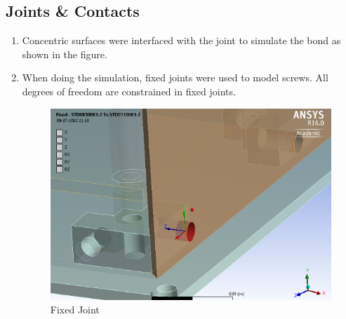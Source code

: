 \documentclass[../../main.tex]{subfiles}
\begin{document}
\subsection{Joints \& Contacts }
    \begin{enumerate}
        \item Concentric surfaces were interfaced with the joint to simulate the bond as shown in the figure.
        \item When doing the simulation, fixed joints were used to model screws. All degrees of freedom are constrained in fixed joints. 
      
        \begin{figure}[H]
        \centering
        \includegraphics[scale=0.5]{Figures/Mechanical/fixed.png}
        \caption{Fixed Joint}
        \label{fig:sys_CAD}
    \end{figure}
        

\end{enumerate}
\end{document}
